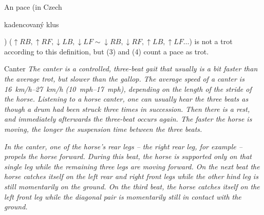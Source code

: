 \begin{remark}
	An pace (in Czech \begin{otherlanguage}{czech}kadencovaný klus\end{otherlanguage}) ($\uparrow RB, \uparrow RF, \downarrow LB, \downarrow LF \sim \downarrow RB, \downarrow RF, \uparrow LB, \uparrow LF \dots$) is not a trot according to this definition, but (3) and (4) count a pace as trot.
\end{remark}

\begin{definition}{Canter}
	\label{def:canter}
	\textit{The canter is a controlled, three-beat gait that usually is a bit faster than the average trot, but slower than the gallop. The average speed of a canter is \SIrange{16}{27}{km/h} (\SIrange{10}{17}{mph}), depending on the length of the stride of the horse. Listening to a horse canter, one can usually hear the three beats as though a drum had been struck three times in succession. Then there is a rest, and immediately afterwards the three-beat occurs again. The faster the horse is moving, the longer the suspension time between the three beats.}
	
	\textit{In the canter, one of the horse's rear legs -- the right rear leg, for example -- propels the horse forward. During this beat, the horse is supported only on that single leg while the remaining three legs are moving forward. On the next beat the horse catches itself on the left rear and right front legs while the other hind leg is still momentarily on the ground. On the third beat, the horse catches itself on the left front leg while the diagonal pair is momentarily still in contact with the ground.} \cite{Harrisc1993}
	

\end{definition}
